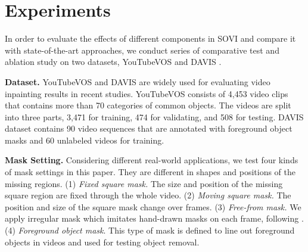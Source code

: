 


\section{Experiments}

In order to evaluate the effects of different components in SOVI and compare it with state-of-the-art approaches, we conduct series of comparative test and ablation study on two datasets, YouTubeVOS \cite{xu2018Youtube} and DAVIS \cite{davis_2017}.

\noindent\textbf{Dataset.} 
YouTubeVOS and DAVIS are widely used for evaluating video inpainting results in recent studies.
YouTubeVOS consists of 4,453 video clips that contains more than 70 categories of common objects. 
The videos are split into three parts, 3,471 for training, 474 for validating, and 508 for testing.
% 
DAVIS dataset contains 90 video sequences that are annotated with foreground object masks and 60 unlabeled videos for training. 



\noindent \textbf{Mask Setting.} Considering different real-world applications, we test four kinds of mask settings in this paper. 
They are different in shapes and positions of the missing regions. 
(1) \emph{Fixed square mask.} The size and position of the missing square region are fixed through the whole video. 
(2) \emph{Moving square mask.} The position and size of the square mask change over frames. 
(3) \emph{Free-from mask.} We apply irregular mask which imitates hand-drawn masks on each frame, following \cite{liu2018partialinpainting}. 
(4) \emph{Foreground object mask}. This type of mask is defined to line out foreground objects in videos and used for testing object removal.

